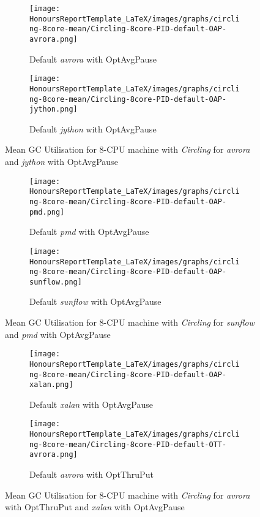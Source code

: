 \newpage
\begin{figure} [H]
\begin{subfigure}{1\textwidth}
\texttt{[image: HonoursReportTemplate\_LaTeX/images/graphs/circling-8core-mean/Circling-8core-PID-default-OAP-avrora.png]}
\caption{Default \emph{avrora} with OptAvgPause}
\label{fig:circling-mean-11}
\end{subfigure}
\begin{subfigure}{1\textwidth}
\texttt{[image: HonoursReportTemplate\_LaTeX/images/graphs/circling-8core-mean/Circling-8core-PID-default-OAP-jython.png]}
\caption{Default \emph{jython} with OptAvgPause}
\label{fig:circling-mean-12}
\end{subfigure}
\caption{Mean GC Utilisation for 8-CPU machine with \emph{Circling} for \emph{avrora} and \emph{jython} with OptAvgPause}
\end{figure}
\newpage
\begin{figure} [H]
 \begin{subfigure}{1\textwidth}
\texttt{[image: HonoursReportTemplate\_LaTeX/images/graphs/circling-8core-mean/Circling-8core-PID-default-OAP-pmd.png]}
\caption{Default \emph{pmd} with OptAvgPause}
\label{fig:circling-mean-13}
\end{subfigure}
 \begin{subfigure}{1\textwidth}
\texttt{[image: HonoursReportTemplate\_LaTeX/images/graphs/circling-8core-mean/Circling-8core-PID-default-OAP-sunflow.png]}
\caption{Default \emph{sunflow} with OptAvgPause}
\label{fig:circling-mean-14}
\end{subfigure}
\caption{Mean GC Utilisation for 8-CPU machine with \emph{Circling} for \emph{sunflow} and \emph{pmd} with OptAvgPause}
\end{figure}
\newpage
\begin{figure} [H]
\begin{subfigure}{1\textwidth}
\texttt{[image: HonoursReportTemplate\_LaTeX/images/graphs/circling-8core-mean/Circling-8core-PID-default-OAP-xalan.png]}
\caption{Default \emph{xalan} with OptAvgPause}
\label{fig:circling-mean-15}
\end{subfigure}
\begin{subfigure}{1\textwidth}
\texttt{[image: HonoursReportTemplate\_LaTeX/images/graphs/circling-8core-mean/Circling-8core-PID-default-OTT-avrora.png]}
\caption{Default \emph{avrora} with OptThruPut}
\label{fig:circling-mean-016}
\end{subfigure}
    \caption{Mean GC Utilisation for 8-CPU machine with \emph{Circling} for \emph{avrora} with OptThruPut and \emph{xalan} with OptAvgPause}
    \label{fig:mean-GC-Util2}
\end{figure}
